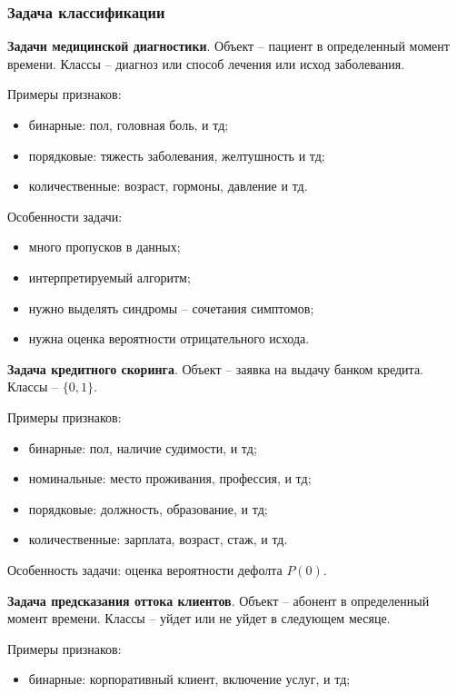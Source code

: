 \begin{multicols}{2}
    \subsubsection*{Задача классификации}
    \par 
    \textbf{Задачи медицинской диагностики}. Объект -- пациент в определенный момент времени. Классы -- диагноз или способ лечения или исход заболевания.
    \par
    Примеры признаков:
    \begin{itemize}
      \item бинарные: пол, головная боль, и тд;
      \item порядковые: тяжесть заболевания, желтушность и тд;
      \item количественные: возраст, гормоны, давление и тд.
    \end{itemize}
    Особенности задачи:
    \begin{itemize}
      \item много пропусков в данных;
      \item интерпретируемый алгоритм;
      \item нужно выделять синдромы -- сочетания симптомов;
      \item нужна оценка вероятности отрицательного исхода.
    \end{itemize}
    \bigskip\par
    \textbf{Задача кредитного скоринга}. Объект -- заявка на выдачу банком кредита. Классы -- $\{0,1\}$.
    \par
    Примеры признаков:
    \begin{itemize}
      \item бинарные: пол, наличие судимости, и тд;
      \item номинальные: место проживания, профессия, и тд;
      \item порядковые: должность, образование, и тд;
      \item количественные: зарплата, возраст, стаж, и тд.
    \end{itemize}
    Особенность задачи: оценка вероятности дефолта $P(0)$.
    \bigskip\par
    \textbf{Задача предсказания оттока клиентов}. Объект -- абонент в определенный момент времени. Классы -- уйдет или не уйдет в следующем месяце.
    \par
    Примеры признаков:
    \begin{itemize}
      \item бинарные: корпоративный клиент, включение услуг, и тд;

\end{itemize}
\end{multicols}
